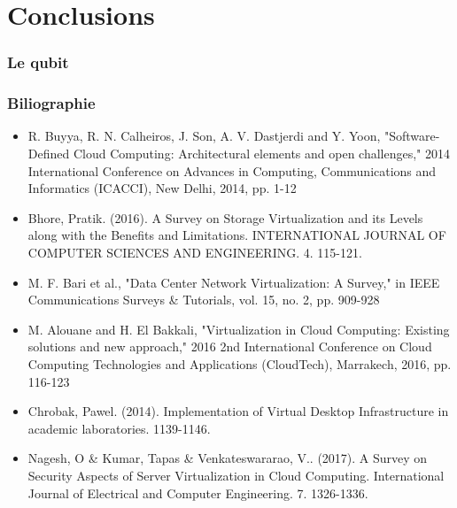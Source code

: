 \documentclass{beamer}
\begin{document}

\section{Conclusions}

\begin{frame}
\frametitle{Le qubit}
\end{frame}

\begin{frame}
\frametitle{Biliographie}
\begin{itemize}
    \fontsize{6pt}{7.2}\selectfont

    \item R. Buyya, R. N. Calheiros, J. Son, A. V. Dastjerdi and Y. Yoon, "Software-Defined Cloud Computing: Architectural elements and open challenges," 2014 International Conference on Advances in Computing, Communications and Informatics (ICACCI), New Delhi, 2014, pp. 1-12
    \item Bhore, Pratik. (2016). A Survey on Storage Virtualization and its Levels along with the Benefits and Limitations. INTERNATIONAL JOURNAL OF COMPUTER SCIENCES AND ENGINEERING. 4. 115-121.
    \item M. F. Bari et al., "Data Center Network Virtualization: A Survey," in IEEE Communications Surveys \& Tutorials, vol. 15, no. 2, pp. 909-928
    \item M. Alouane and H. El Bakkali, "Virtualization in Cloud Computing: Existing solutions and new approach," 2016 2nd International Conference on Cloud Computing Technologies and Applications (CloudTech), Marrakech, 2016, pp. 116-123
    \item Chrobak, Pawel. (2014). Implementation of Virtual Desktop Infrastructure in academic laboratories. 1139-1146.
    \item Nagesh, O \& Kumar, Tapas \& Venkateswararao, V.. (2017). A Survey on Security Aspects of Server Virtualization in Cloud Computing. International Journal of Electrical and Computer Engineering. 7. 1326-1336.
\end{itemize}

\end{frame}
\end{document}

